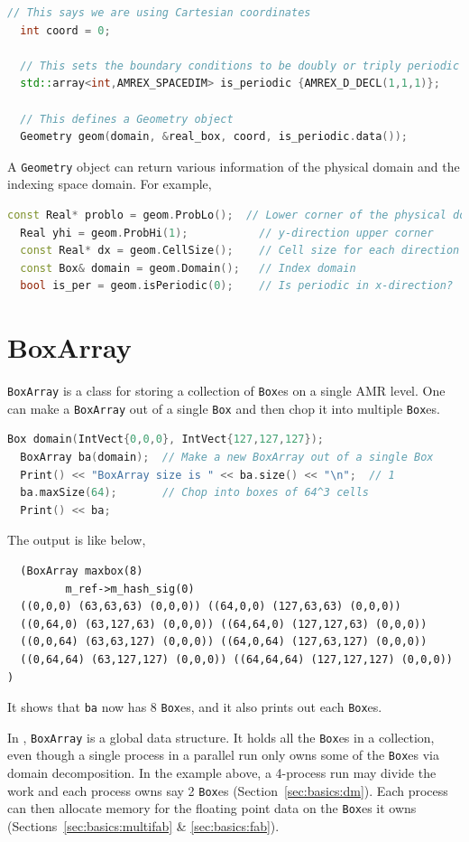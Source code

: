 {\begin{lstlisting}[language=cpp]
  // This says we are using Cartesian coordinates
  int coord = 0;
  
  // This sets the boundary conditions to be doubly or triply periodic
  std::array<int,AMREX_SPACEDIM> is_periodic {AMREX_D_DECL(1,1,1)};
  
  // This defines a Geometry object
  Geometry geom(domain, &real_box, coord, is_periodic.data());
\end{lstlisting}

A {\tt Geometry} object can return various information of the physical
domain and the indexing space domain.  For example,
\begin{lstlisting}[language=cpp]
  const Real* problo = geom.ProbLo();  // Lower corner of the physical domain
  Real yhi = geom.ProbHi(1);           // y-direction upper corner
  const Real* dx = geom.CellSize();    // Cell size for each direction
  const Box& domain = geom.Domain();   // Index domain
  bool is_per = geom.isPeriodic(0);    // Is periodic in x-direction?
\end{lstlisting}


\section{BoxArray}
\label{sec:basics:ba}

{\tt BoxArray} is a class for storing a collection of {\tt Box}es on
a single AMR level.  One can make a {\tt BoxArray} out of a single {\tt Box}
and then chop it into multiple {\tt Box}es.
\begin{lstlisting}[language=cpp]
  Box domain(IntVect{0,0,0}, IntVect{127,127,127});
  BoxArray ba(domain);  // Make a new BoxArray out of a single Box
  Print() << "BoxArray size is " << ba.size() << "\n";  // 1
  ba.maxSize(64);       // Chop into boxes of 64^3 cells
  Print() << ba;
\end{lstlisting}
The output is like below,
\begin{verbatim}
  (BoxArray maxbox(8)
         m_ref->m_hash_sig(0)
  ((0,0,0) (63,63,63) (0,0,0)) ((64,0,0) (127,63,63) (0,0,0))
  ((0,64,0) (63,127,63) (0,0,0)) ((64,64,0) (127,127,63) (0,0,0))
  ((0,0,64) (63,63,127) (0,0,0)) ((64,0,64) (127,63,127) (0,0,0))
  ((0,64,64) (63,127,127) (0,0,0)) ((64,64,64) (127,127,127) (0,0,0)) )
\end{verbatim}
It shows that {\tt ba} now has 8 {\tt Box}es, and it also prints out
each {\tt Box}es.  

In \amrex, {\tt BoxArray} is a global data structure.  It holds all
the {\tt Box}es in a collection, even though a single process in a
parallel run only owns some of the {\tt Box}es via domain
decomposition.  In the example above, a 4-process run may divide the
work and each process owns say 2 {\tt Box}es
(Section~\ref{sec:basics:dm}).  Each process can then allocate memory
for the floating point data on the {\tt Box}es it owns
(Sections~\ref{sec:basics:multifab} \& \ref{sec:basics:fab}). 

}
